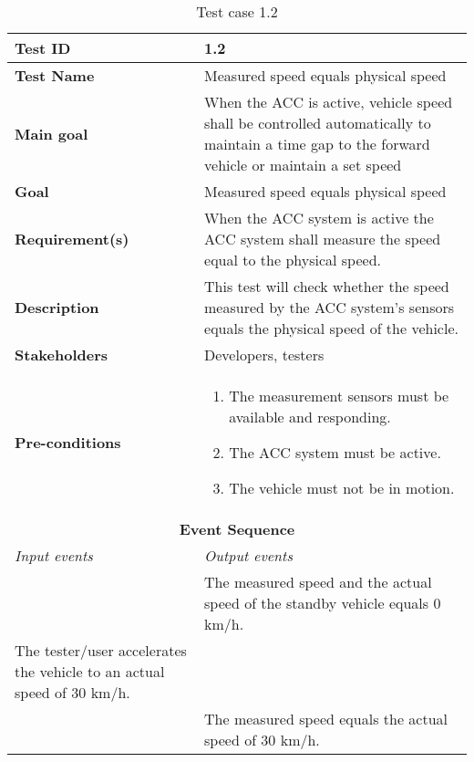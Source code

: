 \begin{table}[H]
\centering
\begin{tabularx}{\linewidth}{X|X}
  \hline
  \textbf{Test ID} & 1.2 \\
  \hline
  \textbf{Test Name} & Measured speed equals physical speed \\
  \hline
  \textbf{Main goal} & When the ACC is active, vehicle speed shall be controlled automatically to maintain a time gap to the forward vehicle or maintain a set speed  \\
  \hline
  \textbf{Goal} & Measured speed equals physical speed \\
  \hline
  \textbf{Requirement(s)} & When the ACC system is active the ACC system shall measure the speed equal to the physical speed. \\
  \hline
  \textbf{Description} & This test will check whether the speed measured by the ACC system's sensors equals the physical speed of the vehicle. \\
  \hline
  \textbf{Stakeholders} & Developers, testers  \\
  \hline
  \textbf{Pre-conditions} &  
  
  \begin{enumerate}
      \item The measurement sensors must be available and responding.
      \item The ACC system must be active.
      \item The vehicle must not be in motion.
  \end{enumerate}
  \\
  \hline
  \multicolumn{2}{c}{\textbf{Event Sequence}} \\
  \hline
  \textit{Input events} & \textit{Output events} \\
  \hline
   &  The measured speed and the actual speed of the standby vehicle equals 0 km/h.\\
  \hline
   The tester/user accelerates the vehicle to an actual speed of 30 km/h. &  \\
  \hline
   &  The measured speed equals the actual speed of 30 km/h. \\
  \hline
  \end{tabularx}
\caption{\label{tab_case2} Test case 1.2}
\end{table}


